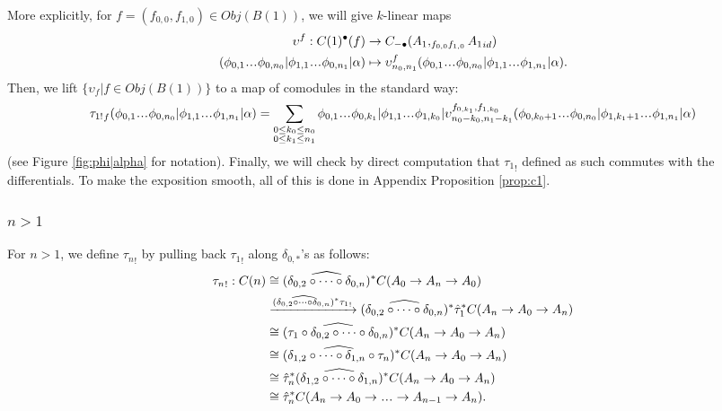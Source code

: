 More explicitly, 
for $f = (f_{0,0}, f_{1,0}) \in Obj(B(1))$, we will 
give $k$-linear maps
\begin{align*}
\upsilon^f: C(1)^\bullet(f) 
& \to 
C_{-\bullet}(A_1, _{f_{0,0}f_{1,0}} {A_1}_{id})\\
(\phi_{0,1}\smdots \phi_{0,n_0}|
 \phi_{1,1}\smdots \phi_{0,n_1}| \alpha )
&\mapsto
\upsilon^f_{n_0,n_1}(\phi_{0,1}\smdots \phi_{0,n_0}|
 \phi_{1,1}\smdots \phi_{1,n_1}| \alpha ).
\end{align*}
Then, we lift $\{\upsilon_f | f \in Obj(B(1))\}$ 
to a map of comodules in the standard way: 
\begin{equation}
\label{eq:colift}
{\tau_{1!}}_f 
  (\phi_{0,1}\smdots \phi_{0,n_0}|
  \phi_{1,1}\smdots \phi_{1,n_1}| \alpha )
= \sum \limits_{\substack{
    0 \leq k_0 \leq n_0\\
    0 \leq k_1 \leq n_1}}
\phi_{0,1}\smdots \phi_{0,k_1}|\phi_{1,1} \smdots \phi_{1,k_0}|
\upsilon^{f_{0,k_1}, f_{1,k_0}}_{n_0-k_0,n_1-k_1} 
  (\phi_{0,k_0+1}\smdots \phi_{0,n_0}|
  \phi_{1,k_1+1}\smdots \phi_{1,n_1}| \alpha )
\end{equation}
(see Figure \ref{fig:phi|alpha} for notation). 
Finally, we will check by direct computation that 
${\tau_1}_!$ defined as such commutes with the 
differentials. To make the exposition smooth, 
all of this is done in Appendix Proposition 
\ref{prop:c1}.

\subsubsection{$n>1$}
For $n>1$, we define ${\tau_n}_!$ by 
pulling back ${\tau_1}_!$ along $\delta_{0,*}$'s 
as follows:
\begin{align*}
{\tau_n}_!: C(n) 
&\cong 
(\widehat{\delta_{0,2}\circ\dots\circ\delta_{0,n}})^*
  C(A_0 \to A_n \to A_0)\\
&\xrightarrow{
  (\widehat{\delta_{0,2}\circ\dots\circ\delta_{0,n}})^*
  {\tau_1}_!}
(\widehat{\delta_{0,2}\circ\dots\circ\delta_{0,n}})^*
  \hat{\tau}_1^*C(A_n \to A_0 \to A_n)\\
&\cong
(\widehat{\tau_1\circ\delta_{0,2}\circ\dots\circ
  \delta_{0,n}})^*C(A_n \to A_0 \to A_n)\\
&\cong
(\widehat{\delta_{1,2}\circ\dots\circ\delta_{1,n}
  \circ \tau_n})^*C(A_n \to A_0 \to A_n)\\
&\cong
\hat{\tau}_n^*
  (\widehat{\delta_{1,2}\circ\dots\circ\delta_{1,n}})^*
  C(A_n \to A_0 \to A_n)\\
&\cong 
\hat{\tau}_n^*C(A_n \to A_0 \to \smdots \to A_{n-1} \to A_n).  
\end{align*}

